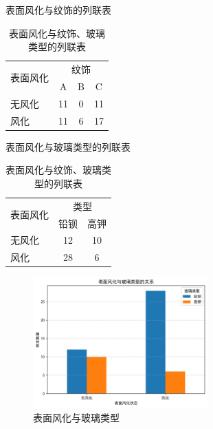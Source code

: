 \documentclass[withoutpreface,bwprint]{cumcmthesis}
\begin{document}
\begin{table}[htbp]
    \centering
    \begin{subtable}[t]{0.45\textwidth}
        \centering
        \caption{表面风化与纹饰的列联表}
        \begin{tabular}{lccc}
            \toprule
            \multirow{2}{*}{表面风化} & \multicolumn{3}{c}{纹饰} \\
            \cmidrule(lr){2-4}
            & A & B & C \\
            \midrule
            无风化 & 11 & 0 & 11 \\
            风化 & 11 & 6 & 17 \\
            \bottomrule
        \end{tabular}
    \end{subtable}
    \hspace{-15mm}%
    \begin{subtable}[t]{0.45\textwidth}
        \centering
        \caption{表面风化与玻璃类型的列联表}
        \begin{tabular}{lcc}
            \toprule
            \multirow{2}{*}{表面风化} & \multicolumn{2}{c}{类型} \\
            \cmidrule(lr){2-3}
            & 铅钡 & 高钾 \\
            \midrule
            无风化 & 12 & 10 \\
            风化 & 28 & 6 \\
            \bottomrule
        \end{tabular}
    \end{subtable}
    \caption{表面风化与纹饰、玻璃类型的列联表} %
\end{table}

\begin{figure}[ht]
\centering
\includegraphics[width=0.6\textwidth]{figures/V4/1-1.png}
\caption{表面风化与玻璃类型}
\label{fig:表面风化与玻璃类型}
\end{figure}
\end{document}
